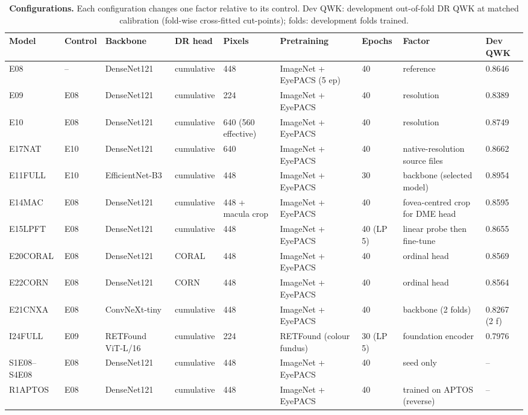 \begin{table}[h]
\caption{\textbf{Configurations.} Each configuration changes one factor relative to its
control. Dev QWK: development out-of-fold DR QWK at matched calibration (fold-wise
cross-fitted cut-points); folds: development folds trained.}\label{tab:s2}
\centering\scriptsize
\begin{tabular}{@{}lllllllll@{}}
\toprule
Model & Control & Backbone & DR head & Pixels & Pretraining & Epochs & Factor & Dev QWK \\
\midrule
E08 & -- & DenseNet121 & cumulative & 448 & ImageNet + EyePACS (5 ep) & 40 & reference & 0.8646 \\
E09 & E08 & DenseNet121 & cumulative & 224 & ImageNet + EyePACS & 40 & resolution & 0.8389 \\
E10 & E08 & DenseNet121 & cumulative & 640 (560 effective) & ImageNet + EyePACS & 40 & resolution & 0.8749 \\
E17NAT & E10 & DenseNet121 & cumulative & 640 & ImageNet + EyePACS & 40 & native-resolution source files & 0.8662 \\
E11FULL & E10 & EfficientNet-B3 & cumulative & 448 & ImageNet + EyePACS & 30 & backbone (selected model) & 0.8954 \\
E14MAC & E08 & DenseNet121 & cumulative & 448 + macula crop & ImageNet + EyePACS & 40 & fovea-centred crop for DME head & 0.8595 \\
E15LPFT & E08 & DenseNet121 & cumulative & 448 & ImageNet + EyePACS & 40 (LP 5) & linear probe then fine-tune & 0.8655 \\
E20CORAL & E08 & DenseNet121 & CORAL & 448 & ImageNet + EyePACS & 40 & ordinal head & 0.8569 \\
E22CORN & E08 & DenseNet121 & CORN & 448 & ImageNet + EyePACS & 40 & ordinal head & 0.8564 \\
E21CNXA & E08 & ConvNeXt-tiny & cumulative & 448 & ImageNet + EyePACS & 40 & backbone (2 folds) & 0.8267 (2 f) \\
I24FULL & E09 & RETFound ViT-L/16 & cumulative & 224 & RETFound (colour fundus) & 30 (LP 5) & foundation encoder & 0.7976 \\
S1E08--S4E08 & E08 & DenseNet121 & cumulative & 448 & ImageNet + EyePACS & 40 & seed only & -- \\
R1APTOS & E08 & DenseNet121 & cumulative & 448 & ImageNet + EyePACS & 40 & trained on APTOS (reverse) & -- \\
\bottomrule
\end{tabular}
\end{table}
